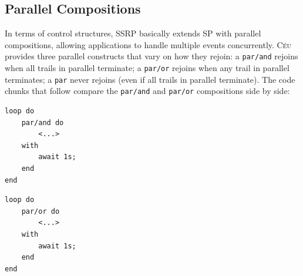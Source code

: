 \documentclass{sigplanconf}
\newcommand{\CEU}{\textsc{C\'{e}u}\xspace}
\newcommand{\code}[1] {{\small{\texttt{#1}}}}
\newcommand{\1}{\;}
\newcommand{\2}{\;\;}
\newcommand{\3}{\;\;\;}
\newcommand{\5}{\;\;\;\;\;}
\begin{document}

%



\subsection{Parallel Compositions}
\label{sec.ceu.par}

In terms of control structures, SSRP basically extends SP with parallel 
compositions, allowing applications to handle multiple events concurrently.
%
\CEU provides three parallel constructs that vary on how they rejoin:
a \code{par/and} rejoins when all trails in parallel terminate;
a \code{par/or} rejoins when any trail in parallel terminates;
a \code{par} never rejoins (even if all trails in parallel terminate).
%
The code chunks that follow compare the \code{par/and} and \code{par/or} 
compositions side by side:

\begin{minipage}[t]{0.40\linewidth}
\begin{lstlisting}
loop do
    par/and do
        <...>
    with
        await 1s;
    end
end
\end{lstlisting}
\end{minipage}
%
\begin{minipage}[t]{0.40\linewidth}
\begin{lstlisting}
loop do
    par/or do
        <...>
    with
        await 1s;
    end
end
\end{lstlisting}
\end{minipage}
\end{document}
